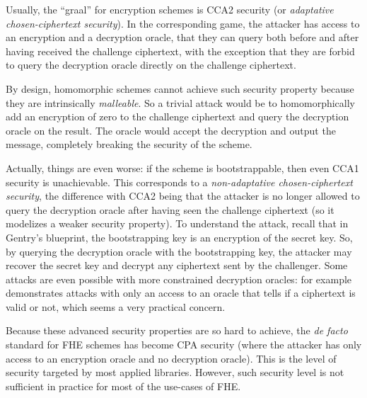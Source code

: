 Usually, the ``graal'' for encryption schemes is \textsf{CCA2} security (or \textit{adaptative chosen-ciphertext security}). In the corresponding game, the attacker has access to an encryption and a decryption oracle, that they can query both before and after having received the challenge ciphertext, with the exception that they are forbid to query the decryption oracle directly on the challenge ciphertext.



By design, homomorphic schemes cannot achieve such security property because they are intrinsically \textit{malleable}. So a trivial attack would be to homomorphically add an encryption of zero to the challenge ciphertext and query the decryption oracle on the result. The oracle would accept the decryption and output the message, completely breaking the security of the scheme.

Actually, things are even worse: if the scheme is bootstrappable, then even \textsf{CCA1} security is unachievable. This corresponds to a \textit{non-adaptative chosen-ciphertext security}, the difference with \textsf{CCA2} being that the attacker is no longer allowed to query the decryption oracle after having seen the challenge ciphertext (so it modelizes a weaker security property). To understand the attack, recall that in Gentry's blueprint, the bootstrapping key is an encryption of the secret key. So, by querying the decryption oracle with the bootstrapping key, the attacker may recover the secret key and decrypt any ciphertext sent by the challenger. Some attacks are even possible with more constrained decryption oracles: for example \cite{SAC:LMSV11} demonstrates attacks with only an access to an oracle that tells if a ciphertext is valid or not, which seems a very practical concern.


Because these advanced security properties are so hard to achieve, the \textit{de facto} standard for FHE schemes has become \textsf{CPA} security (where the attacker has only access to an encryption oracle and no decryption oracle). This is the level of security targeted by most applied libraries. However, such security level is not sufficient in practice for most of the use-cases of FHE.


